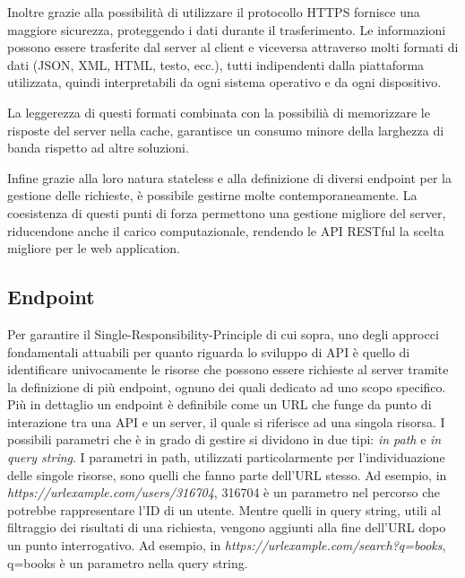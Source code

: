 Inoltre grazie alla possibilità di utilizzare il protocollo HTTPS fornisce una maggiore sicurezza, proteggendo i dati durante il trasferimento.
Le informazioni possono essere trasferite dal server al client e viceversa attraverso molti formati di dati (JSON, XML, HTML, testo, ecc.), tutti indipendenti dalla piattaforma utilizzata, quindi interpretabili da ogni sistema operativo e da ogni dispositivo.

La leggerezza di questi formati combinata con la possibilià di memorizzare le risposte del server nella cache, garantisce un consumo minore della larghezza di banda rispetto ad altre soluzioni.

Infine grazie alla loro natura stateless e alla definizione di diversi endpoint per la gestione delle richieste, è possibile gestirne molte contemporaneamente.
La coesistenza di questi punti di forza permettono una gestione migliore del server, riducendone anche il carico computazionale, rendendo le API RESTful la scelta migliore per le web application.
\thispagestyle{mystyle}

\subsection{Endpoint}
Per garantire il Single-Responsibility-Principle di cui sopra, uno degli approcci fondamentali attuabili per quanto riguarda lo sviluppo di API è quello di identificare univocamente le risorse che possono essere richieste al server tramite la definizione di più endpoint, ognuno dei quali dedicato ad uno scopo specifico.
Più in dettaglio un endpoint è definibile come un URL  che funge da punto di interazione tra una API e un server, il quale si riferisce ad una singola risorsa.
I possibili parametri che è in grado di gestire si dividono in due tipi: \emph{in path} e  \emph{in query string}.
I parametri in path, utilizzati particolarmente per l'individuazione delle singole risorse, sono quelli che fanno parte dell'URL stesso.
Ad esempio, in \emph{https://urlexample.com/users/316704}, 316704 è un parametro nel percorso che potrebbe rappresentare l’ID di un utente.
Mentre quelli in query string, utili al filtraggio dei risultati di una richiesta, vengono aggiunti alla fine dell'URL dopo un 
punto interrogativo. Ad esempio, in  \emph{https://urlexample.com/search?q=books}, q=books è un parametro nella query string.


